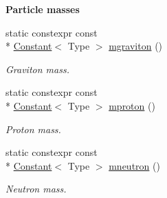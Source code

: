 \begin{Indent}{\bf Particle masses}
\begin{DoxyCompactItemize}
static constexpr const \\*
\hyperlink{exceptionmagrathea_1_1Constant}{Constant}$<$ Type $>$ \hyperlink{exceptionmagrathea_1_1Constants_a454151dcbd819c0239ff0c53c7e8035d}{mgraviton} ()
\begin{DoxyCompactList}\small\item\em Graviton mass. \end{DoxyCompactList}\item 
static constexpr const \\*
\hyperlink{exceptionmagrathea_1_1Constant}{Constant}$<$ Type $>$ \hyperlink{exceptionmagrathea_1_1Constants_aaf2826ecd5623369a0a9774e3e8d45c3}{mproton} ()
\begin{DoxyCompactList}\small\item\em Proton mass. \end{DoxyCompactList}\item 
static constexpr const \\*
\hyperlink{exceptionmagrathea_1_1Constant}{Constant}$<$ Type $>$ \hyperlink{exceptionmagrathea_1_1Constants_af13945dc5f873139dcd9d7cf7b9e9ab9}{mneutron} ()
\begin{DoxyCompactList}\small\item\em Neutron mass. \end{DoxyCompactList}\end{DoxyCompactItemize}
\end{Indent}
